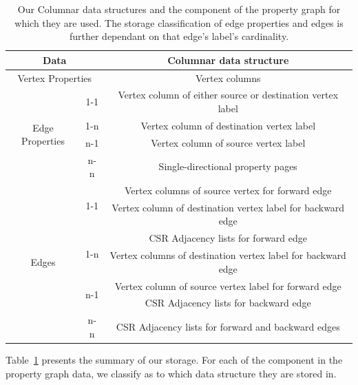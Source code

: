 \begin{table}[t!]
	\centering
	\bgroup
	\setlength{\tabcolsep}{10pt}
	\def\arraystretch{1.3}%
	\begin{tabular}{ |c|c|c| } 
		\hline
		\multicolumn{2}{|c|}{\textbf{Data}} & \textbf{Columnar data structure} \\
		\hline \hline
		\multicolumn{2}{|c|}{Vertex Properties} & Vertex columns \\
		\hline \hline
		\multirow{4}{60pt}{Edge Properties} & 1-1 & Vertex column of either source or destination vertex label\\
		\cline{2-3}
		& 1-n & Vertex column of destination vertex label\\
		\cline{2-3}
		& n-1 & Vertex column of source vertex label\\
		\cline{2-3}
		& n-n & Single-directional property pages \\
		\hline \hline
		\multirow{7}{60pt}{Edges} & \multirow{2}{20pt}{1-1} & Vertex columns of source vertex for forward edge \\
		&& Vertex column of destination vertex label for backward edge \\
		\cline{2-3}
		& \multirow{2}{20pt}{1-n} & CSR Adjacency lists for forward edge \\
		&& Vertex columns of destination vertex label for backward edge \\
		\cline{2-3}
		& \multirow{2}{20pt}{n-1} & Vertex column of source vertex label for forward edge \\
		&& CSR Adjacency lists for backward edge \\
		\cline{2-3}
		& \multirow{1}{20pt}{n-n} & CSR Adjacency lists for forward and backward edges \\
		\hline
	\end{tabular}
	\egroup
	\captionsetup{justification=centering}
	\caption{Our Columnar data structures and the component of the property graph for which they are used. The storage classification of edge properties and edges is further dependant on that edge's label's cardinality.}
	\label{tbl:summ}
\end{table}

Table~\ref{tbl:summ} presents the summary of our storage. For each of the component in the property graph data, we classify as to which data structure they are stored in. 
